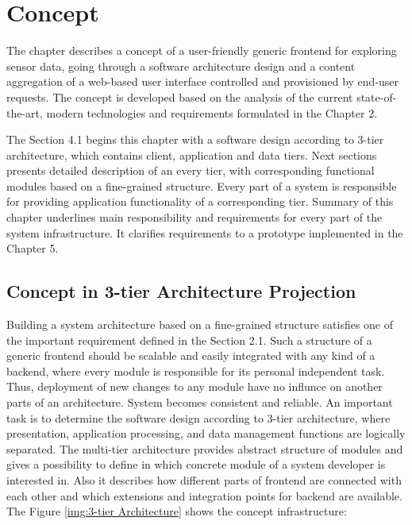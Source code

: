 \chapter{Concept}
     The chapter describes a concept of a user-friendly generic frontend for exploring sensor data, going through a software architecture design and a content aggregation of a web-based user interface controlled and provisioned by end-user requests. The concept is developed based on the analysis of the current state-of-the-art, modern technologies and requirements formulated in the Chapter 2. 

     The Section 4.1 begins this chapter with a software design according to 3-tier architecture, which contains client, application and data tiers. Next sections presents detailed description of an every tier, with corresponding functional modules based on a fine-grained structure. Every part of a system is responsible for providing application functionality of a corresponding tier. Summary of this chapter underlines main responsibility and requirements for every part of the system infrastructure. It clarifies requirements to a prototype implemented in the Chapter 5.


\section{Concept in 3-tier Architecture Projection}

  Building a system architecture based on a fine-grained structure satisfies one of the important requirement defined in the Section 2.1. Such a structure of a generic frontend should be scalable and easily integrated with any kind of a backend, where every module is responsible for its personal independent task. Thus, deployment of new changes to any module have no influnce on another parts of an architecture. System becomes consistent and reliable. An important task is to determine the software design according to 3-tier architecture, where presentation, application processing, and data management functions are logically separated. The multi-tier architecture provides abstract structure of modules and gives a possibility to define in which concrete module of a system developer is interested in. Also it describes how different parts of frontend are connected with each other and which extensions and integration points for backend are available.
  \newline
  The Figure \ref{img:3-tier Architecture} shows the concept infrastructure:

